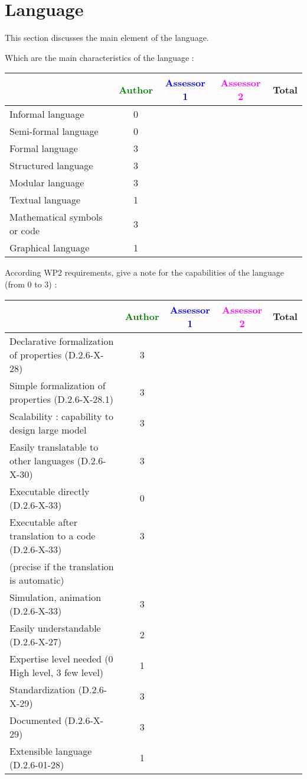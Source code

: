 \section{Language}
This section discusses the main element of the language.

Which are the main characteristics of the language :

\begin{tabular}{|l | c | c | c | c|}
\hline
& \textcolor{green}{Author} & \textcolor{blue}{Assessor 1} & \textcolor{magenta}{Assessor 2} & Total \\
\hline 
Informal language & 0 & & &  \\
\hline 
Semi-formal language & 0 & & &  \\
\hline
Formal language & 3 & & &  \\
\hline
Structured language & 3 & & & \\
\hline
Modular language & 3 & & & \\
\hline
Textual language & 1 & & & \\
\hline
Mathematical symbols or code & 3 & & & \\
\hline
Graphical language & 1 & & & \\
\hline
\end{tabular}

According WP2 requirements, give a note for the capabilities of the language (from 0 to 3) :

\begin{tabular}{|l | c | c | c | c|}
\hline
& \textcolor{green}{Author} & \textcolor{blue}{Assessor 1} & \textcolor{magenta}{Assessor 2} & Total \\
\hline
Declarative formalization of properties (D.2.6-X-28) & 3 & & & \\
\hline
Simple formalization of properties (D.2.6-X-28.1) & 3 & & & \\
\hline
Scalability : capability to design large model & 3 & & & \\
\hline
Easily translatable to other languages (D.2.6-X-30) & 3 & & & \\
\hline
Executable directly (D.2.6-X-33) & 0 & & & \\
\hline
Executable after translation to a code (D.2.6-X-33) & 3 & & & \\
(precise if the translation is automatic) & & & & \\
\hline
Simulation, animation (D.2.6-X-33) &  3 & & & \\
\hline
Easily understandable (D.2.6-X-27) & 2 & & & \\
\hline
Expertise level needed (0 High level, 3 few level) &  1 & & & \\
\hline
Standardization (D.2.6-X-29) & 3 & & & \\
\hline
Documented (D.2.6-X-29) & 3 & & & \\
\hline
Extensible language (D.2.6-01-28) & 1 & & & \\
\hline
\end{tabular}



